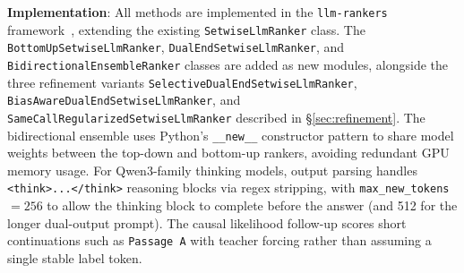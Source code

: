 \textbf{Implementation}: All methods are implemented in the \texttt{llm-rankers} framework~\citep{zhuang2024setwise}, extending the existing \texttt{SetwiseLlmRanker} class. The \texttt{BottomUpSetwiseLlmRanker}, \texttt{DualEndSetwiseLlmRanker}, and \texttt{BidirectionalEnsembleRanker} classes are added as new modules, alongside the three refinement variants \texttt{SelectiveDualEndSetwiseLlmRanker}, \texttt{BiasAwareDualEndSetwiseLlmRanker}, and \texttt{SameCallRegularizedSetwiseLlmRanker} described in \S\ref{sec:refinement}. The bidirectional ensemble uses Python's \texttt{\_\_new\_\_} constructor pattern to share model weights between the top-down and bottom-up rankers, avoiding redundant GPU memory usage. For Qwen3-family thinking models, output parsing handles \texttt{<think>...</think>} reasoning blocks via regex stripping, with \texttt{max\_new\_tokens}${}=256$ to allow the thinking block to complete before the answer (and 512 for the longer dual-output prompt). The causal likelihood follow-up scores short continuations such as \texttt{Passage A} with teacher forcing rather than assuming a single stable label token.
